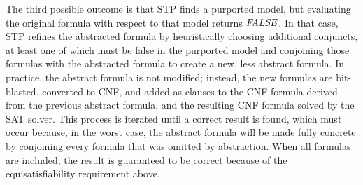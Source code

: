 The third possible outcome is that STP finds a purported model, but
evaluating the original formula with respect to that model returns
${\it FALSE}$.  In that case, STP refines the abstracted formula by
heuristically choosing additional conjuncts, at least one of which
must be false in the purported model and conjoining those formulas
with the abstracted formula to create a new, less abstract formula.
In practice, the abstract formula is not modified; instead, the new
formulas are bit-blasted, converted to CNF, and added as clauses to
the CNF formula derived from the previous abstract formula, and the
resulting CNF formula solved by the SAT solver.  This process is
iterated until a correct result is found, which must occur because, in
the worst case, the abstract formula will be made fully concrete by
conjoining every formula that was omitted by abstraction.  When all
formulas are included, the result is guaranteed to be correct because
of the equisatisfiability requirement above.
